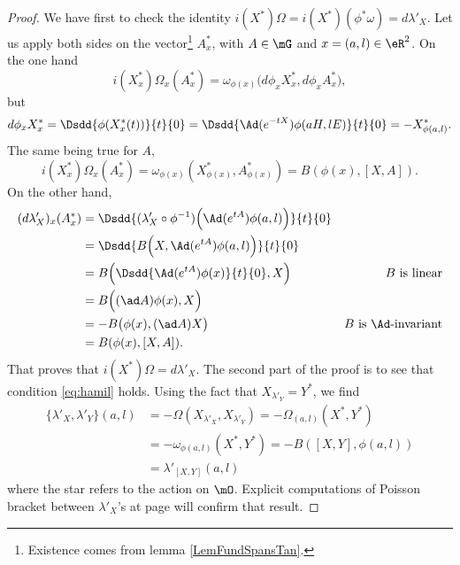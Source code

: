 \begin{proof}
We have first to check the identity $i(X^*)\Omega=i(X^*)(\phi^*\omega)=d\lambda'_X$. Let us apply both sides on the vector\footnote{Existence comes from lemma \ref{LemFundSpansTan}.} $A^*_x$, with $A\in\mG$ and $x=(a,l)\in\eR^2$. On the one hand
\[
  i(X^*_x)\Omega_x(A^*_x)=\omega_{\phi(x)}\big(   d\phi_xX^*_x,d\phi_xA^*_x   \big),
\]
but  
\begin{equation}
  d\phi_xX^*_x=\Dsdd{\phi(X^*_x(t))}{t}{0}
              =\Dsdd{ \Ad(e^{-tX})\phi(aH,lE) }{t}{0}
          =-X^*_{\phi(a,l)}.
\end{equation}
The same being true for $A$,
\[
  i(X^*_x)\Omega_x(A^*_x)=\omega_{\phi(x)}(X^*_{\phi(x)},A^*_{\phi(x)})=B(\phi(x),[X,A]).
\]
On the other hand,
\begin{equation}
\begin{aligned}
    (d\lambda'_X)_x(A^*_x)&=\Dsdd{ (\lambda'_X\circ\phi^{-1})\Big(   \Ad(e^{tA})\phi(a,l)   \Big) }{t}{0}\\
                         &=\Dsdd{  B\Big(X,\Ad(e^{tA})\phi(a,l) \Big)  }{t}{0} \\
             &=B\Big(  \Dsdd{\Ad(e^{tA})\phi(x)}{t}{0},X   \Big)    &\text{$B$ is linear}\\
             &=B\Big(  (\ad A)\phi(x),X   \Big)\\
             &=-B\big(\phi(x),(\ad A)X\big) &\text{$B$ is $\Ad$-invariant}\\
             &=B(\phi(x),[X,A]).
\end{aligned}
\end{equation}
That proves that $i(X^*)\Omega=d\lambda'_X$.  The second part of the proof is to see that condition \eqref{eq:hamil} holds.  Using the fact that $X_{\lambda'_Y}=Y^*$, we find
\[ 
\begin{split}
  \{ \lambda'_X,\lambda'_Y \}(a,l)&=-\Omega(X_{\lambda'_X},X_{\lambda'_Y})
        =-\Omega_{(a,l)}(X^*,Y^*)\\
        &=-\omega_{\phi(a,l)}(X^*,Y^*)
        =-B([X,Y],\phi(a,l))\\
        &=\lambda'_{[X,Y]}(a,l)
\end{split}
\]
where the star refers to the action on $\mO$. Explicit computations of Poisson bracket between $\lambda'_X$'s at page \pageref{pg:explic_com_lamb} will confirm that result.

\end{proof}

